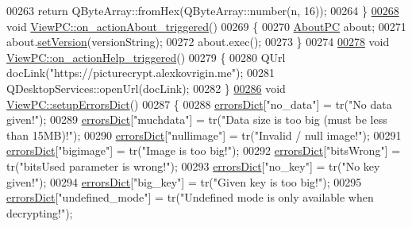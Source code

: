 \begin{DoxyCode}
00263     \textcolor{keywordflow}{return} QByteArray::fromHex(QByteArray::number(n, 16));
00264 \}
\hypertarget{viewpc_8cpp_source.tex_l00268}{}\hyperlink{class_view_p_c_a09a46da4d492eb3dde88f35dc58c997b}{00268} \textcolor{keywordtype}{void} \hyperlink{class_view_p_c_a09a46da4d492eb3dde88f35dc58c997b}{ViewPC::on\_actionAbout\_triggered}()
00269 \{
00270     \hyperlink{class_about_p_c}{AboutPC} about;
00271     about.\hyperlink{class_about_p_c_aa3815d4826d0c8d87122449537a0a4d5}{setVersion}(versionString);
00272     about.exec();
00273 \}
00274 
\hypertarget{viewpc_8cpp_source.tex_l00278}{}\hyperlink{class_view_p_c_a0d252ff4829260c6c76769fbd24b7cd7}{00278} \textcolor{keywordtype}{void} \hyperlink{class_view_p_c_a0d252ff4829260c6c76769fbd24b7cd7}{ViewPC::on\_actionHelp\_triggered}()
00279 \{
00280     QUrl docLink(\textcolor{stringliteral}{"https://picturecrypt.alexkovrigin.me"});
00281     QDesktopServices::openUrl(docLink);
00282 \}
\hypertarget{viewpc_8cpp_source.tex_l00286}{}\hyperlink{class_view_p_c_a89236a0bb8760f02e984b85a8571934c}{00286} \textcolor{keywordtype}{void} \hyperlink{class_view_p_c_a89236a0bb8760f02e984b85a8571934c}{ViewPC::setupErrorsDict}()
00287 \{
00288     \hyperlink{class_view_p_c_aaf7f058e5589d65fec72a21abfd5629b}{errorsDict}[\textcolor{stringliteral}{"no\_data"}] = tr(\textcolor{stringliteral}{"No data given!"});
00289     \hyperlink{class_view_p_c_aaf7f058e5589d65fec72a21abfd5629b}{errorsDict}[\textcolor{stringliteral}{"muchdata"}] = tr(\textcolor{stringliteral}{"Data size is too big (must be less than 15MB)!"});
00290     \hyperlink{class_view_p_c_aaf7f058e5589d65fec72a21abfd5629b}{errorsDict}[\textcolor{stringliteral}{"nullimage"}] = tr(\textcolor{stringliteral}{"Invalid / null image!"});
00291     \hyperlink{class_view_p_c_aaf7f058e5589d65fec72a21abfd5629b}{errorsDict}[\textcolor{stringliteral}{"bigimage"}] = tr(\textcolor{stringliteral}{"Image is too big!"});
00292     \hyperlink{class_view_p_c_aaf7f058e5589d65fec72a21abfd5629b}{errorsDict}[\textcolor{stringliteral}{"bitsWrong"}] = tr(\textcolor{stringliteral}{"bitsUsed parameter is wrong!"});
00293     \hyperlink{class_view_p_c_aaf7f058e5589d65fec72a21abfd5629b}{errorsDict}[\textcolor{stringliteral}{"no\_key"}] = tr(\textcolor{stringliteral}{"No key given!"});
00294     \hyperlink{class_view_p_c_aaf7f058e5589d65fec72a21abfd5629b}{errorsDict}[\textcolor{stringliteral}{"big\_key"}] = tr(\textcolor{stringliteral}{"Given key is too big!"});
00295     \hyperlink{class_view_p_c_aaf7f058e5589d65fec72a21abfd5629b}{errorsDict}[\textcolor{stringliteral}{"undefined\_mode"}] = tr(\textcolor{stringliteral}{"Undefined mode is only available when decrypting!"});

\end{DoxyCode}
